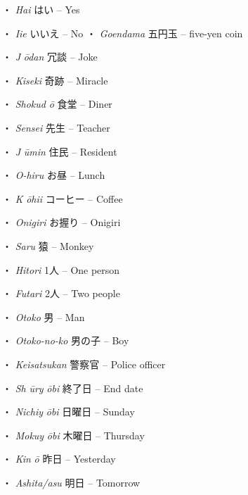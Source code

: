 \par{・ \emph{Hai }はい – Yes }

\par{・ \emph{Iie }いいえ – No }
 ・ \emph{Goendama } 五円玉 – five-yen coin 
\par{・ \emph{J }\emph{ōdan }冗談 – Joke }

\par{・ \emph{Kiseki }奇跡 – Miracle }

\par{・ \emph{Shokud }\emph{ō }食堂 – Diner }

\par{・ \emph{Sensei }先生 – Teacher }

\par{・ \emph{J }\emph{ūmin }住民 – Resident }

\par{・ \emph{O-hiru }お昼 – Lunch }

\par{・ \emph{K }\emph{ōhii }コーヒー – Coffee }

\par{・ \emph{Onigiri }お握り – Onigiri }

\par{・ \emph{Saru }猿 – Monkey }

\par{・ \emph{Hitori }1人 – One person }

\par{・ \emph{Futari }2人 – Two people }

\par{・ \emph{Otoko }男 – Man }

\par{・ \emph{Otoko-no-ko }男の子 – Boy }

\par{・ \emph{Keisatsukan }警察官 – Police officer }

\par{・ \emph{Sh }\emph{ūry }\emph{ōbi }終了日 – End date }

\par{・ \emph{Nichiy }\emph{ōbi }日曜日 – Sunday }

\par{・ \emph{Mokuy }\emph{ōbi }木曜日 – Thursday }

\par{・ \emph{Kin }\emph{ō }昨日 – Yesterday }

\par{・ \emph{Ashita\slash asu } 明日 – Tomorrow }

